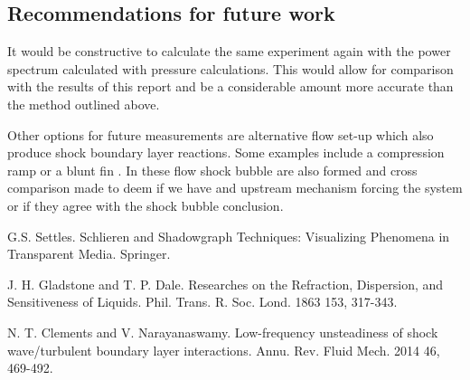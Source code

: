 \documentclass[a4paper,10pt,twoside]{article}
\begin{document}
\begin{multicols}{2}





\section{Recommendations for future work}





It would be constructive to calculate the same experiment again with the power spectrum calculated with pressure calculations. This would allow for comparison with the results of this report and be a considerable amount more accurate than the method outlined above. \par

Other options for future measurements are alternative flow set-up which also produce shock boundary layer reactions. Some examples include a compression ramp or a blunt fin \cite{2}. In these flow shock bubble are also formed and cross comparison made to deem if we have and upstream mechanism forcing the system or if they agree with the shock bubble conclusion. \par










\begin{thebibliography}{9}





 G.S. Settles. Schlieren and Shadowgraph Techniques: Visualizing Phenomena in Transparent Media. Springer.



 J. H. Gladstone and T. P. Dale. Researches on the Refraction, Dispersion, and Sensitiveness of Liquids. Phil. Trans. R. Soc. Lond. 1863 153, 317-343.



 N. T. Clements and V. Narayanaswamy. Low-frequency unsteadiness of shock wave/turbulent boundary layer interactions. Annu. Rev. Fluid Mech. 2014 46, 469-492.




\end{thebibliography}
\end{multicols}
\end{document}
